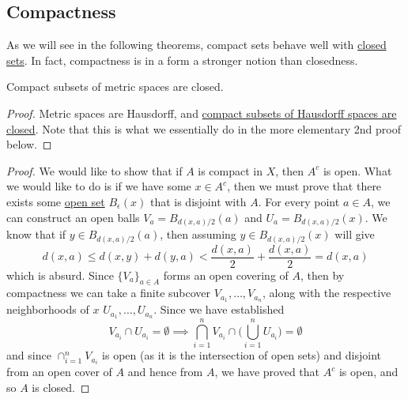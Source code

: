 \subsection{Compactness} 

  As we will see in the following theorems, compact sets behave well with \hyperref[def:closed]{closed sets}. In fact, compactness is in a form a stronger notion than closedness. 

  \begin{theorem}
    \label{thm:compact-subsets-of-metric-spaces-are-closed}
    Compact subsets of metric spaces are closed. 
  \end{theorem}
  \begin{proof}
    Metric spaces are Hausdorff, and \hyperref[thm:compact-subsets-of-hausdorff-spaces-are-closed]{compact subsets of Hausdorff spaces are closed}. Note that this is what we essentially do in the more elementary 2nd proof below. 
  \end{proof}
  \begin{proof}
    We would like to show that if $A$ is compact in $X$, then $A^c$ is open. What we would like to do is if we have some $x \in A^c$, then we must prove that there exists some \hyperref[def:open-set]{open set} $B_\epsilon (x)$ that is disjoint with $A$. For every point $a \in A$, we can construct an open balls $V_a = B_{d(x, a)/2} (a)$ and $U_a = B_{d(x, a)/2} (x)$. We know that if $y \in B_{d(x, a)/2}(a)$, then assuming $y \in B_{d(x, a)/2} (x)$ will give
    \begin{equation}
      d(x, a) \leq d(x, y) + d(y, a) < \frac{d(x, a)}{2} + \frac{d(x, a)}{2} = d(x, a)
    \end{equation}
    which is absurd. 
    Since $\{V_a\}_{a \in A}$ forms an open covering of $A$, then by compactness we can take a finite subcover $V_{a_1}, \ldots, V_{a_n}$, along with the respective neighborhoods of $x$ $U_{a_1}, \ldots, U_{a_n}$. Since we have established 
    \begin{equation}
      V_{a_i} \cap U_{a_i} = \emptyset \implies \bigcap_{i=1}^n V_{a_i} \cap \bigg( \bigcup_{i=1}^n U_{a_i} \bigg) = \emptyset
    \end{equation}
    and since $\cap_{i=1}^n V_{a_i}$ is open (as it is the intersection of open sets) and disjoint from an open cover of $A$ and hence from $A$, we have proved that $A^c$ is open, and so $A$ is closed. 
  \end{proof}

